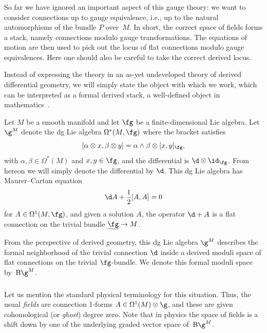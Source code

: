 \documentclass[10pt]{amsart}
\begin{document}
\subsubsection{}

So far we have ignored an important aspect of this gauge theory:
we want to consider connections up to gauge equivalence,
i.e., up to the natural automorphisms of the bundle $P$ over~$M$.
In short, the correct space of fields forms a stack, namely connections modulo gauge transformations.
The equations of motion are then used to pick out the locus of flat connections modulo gauge equivalences.
Here one should also be careful to take the correct derived locus.

Instead of expressing the theory in an as-yet undeveloped theory of derived differential geometry,
we will simply state the object with which we work, 
which can be interpreted as a formal derived stack,
a well-defined object in mathematics~\cite{LurSAG,ToeVez}.

\begin{dfn}
\label{dfn:g^M}
Let $M$ be a smooth manifold and
let $\fg$ be a finite-dimensional Lie algebra.
Let $\g^M$ denote the dg Lie algebra $\Omega^*(M,\fg)$ where the bracket satisfies
\[
[\alpha \otimes x, \beta \otimes y] = \alpha \wedge \beta \otimes [x,y]_{\fg},
\]
with $\alpha,\beta \in \Omega^*(M)$ and $x,y \in \fg$, and the differential is $\d \otimes \id_\fg$.
From hereon we will simply denote the differential by $\d$.
This dg Lie algebra has Maurer--Cartan equation
\begin{equation}\label{MCeqn}
\d A + \frac{1}{2} [A,A]= 0
\end{equation}
for $A \in \Omega^1(M,\fg)$, and 
given a solution $A$, the operator $\d + A$ is a flat connection on the trivial bundle $\underline{\fg} \to M$.
\end{dfn}

From the perspective of derived geometry, 
this dg Lie algebra $\g^M$ describes the formal neighborhood of the trivial connection $\d$ inside a derived moduli space of flat connections on the trivial $\fg$-bundle.
We denote this formal moduli space by~${\rm B}\g^M$.

\subsubsection{}
\label{subsec:CSfields}

Let us mention the standard physical terminology for this situation.
Thus, the usual {\em fields} are connection 1-forms $A \in \Omega^1(M) \otimes \g$,
and these are given cohomological (or {\em ghost}) degree zero.
Note that in physics the space of fields is a shift down by one of the underlying graded vector space of~${\rm B}\g^M$.
\end{document}
